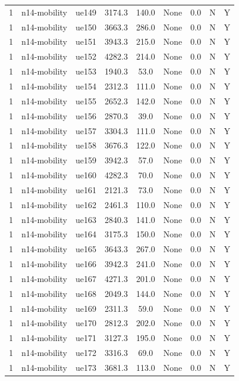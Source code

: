\begin{table}[ht]
\begin{tabular}{|c|c|c|c|c|c|c|c|c|}
1 & n14-mobility & ue149 & 3174.3 & 140.0 & None & 0.0 & N & Y \\
1 & n14-mobility & ue150 & 3663.3 & 286.0 & None & 0.0 & N & Y \\
1 & n14-mobility & ue151 & 3943.3 & 215.0 & None & 0.0 & N & Y \\
1 & n14-mobility & ue152 & 4282.3 & 214.0 & None & 0.0 & N & Y \\
1 & n14-mobility & ue153 & 1940.3 & 53.0 & None & 0.0 & N & Y \\
1 & n14-mobility & ue154 & 2312.3 & 111.0 & None & 0.0 & N & Y \\
1 & n14-mobility & ue155 & 2652.3 & 142.0 & None & 0.0 & N & Y \\
1 & n14-mobility & ue156 & 2870.3 & 39.0 & None & 0.0 & N & Y \\
1 & n14-mobility & ue157 & 3304.3 & 111.0 & None & 0.0 & N & Y \\
1 & n14-mobility & ue158 & 3676.3 & 122.0 & None & 0.0 & N & Y \\
1 & n14-mobility & ue159 & 3942.3 & 57.0 & None & 0.0 & N & Y \\
1 & n14-mobility & ue160 & 4282.3 & 70.0 & None & 0.0 & N & Y \\
1 & n14-mobility & ue161 & 2121.3 & 73.0 & None & 0.0 & N & Y \\
1 & n14-mobility & ue162 & 2461.3 & 110.0 & None & 0.0 & N & Y \\
1 & n14-mobility & ue163 & 2840.3 & 141.0 & None & 0.0 & N & Y \\
1 & n14-mobility & ue164 & 3175.3 & 150.0 & None & 0.0 & N & Y \\
1 & n14-mobility & ue165 & 3643.3 & 267.0 & None & 0.0 & N & Y \\
1 & n14-mobility & ue166 & 3942.3 & 241.0 & None & 0.0 & N & Y \\
1 & n14-mobility & ue167 & 4271.3 & 201.0 & None & 0.0 & N & Y \\
1 & n14-mobility & ue168 & 2049.3 & 144.0 & None & 0.0 & N & Y \\
1 & n14-mobility & ue169 & 2311.3 & 59.0 & None & 0.0 & N & Y \\
1 & n14-mobility & ue170 & 2812.3 & 202.0 & None & 0.0 & N & Y \\
1 & n14-mobility & ue171 & 3127.3 & 195.0 & None & 0.0 & N & Y \\
1 & n14-mobility & ue172 & 3316.3 & 69.0 & None & 0.0 & N & Y \\
1 & n14-mobility & ue173 & 3681.3 & 113.0 & None & 0.0 & N & Y \\

\end{tabular}
\end{table}
